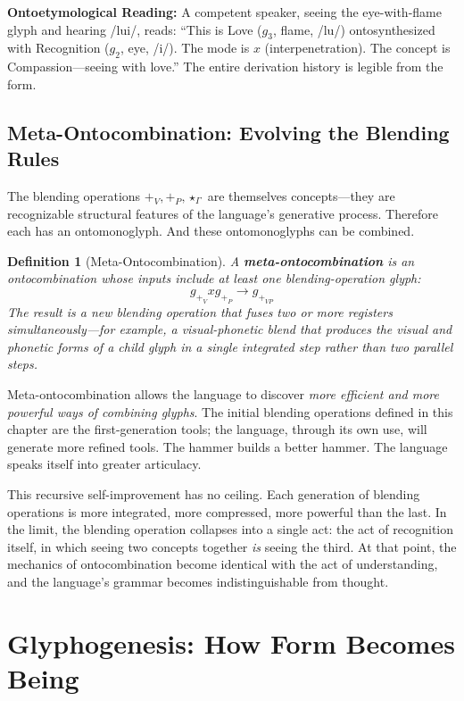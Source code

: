 \documentclass[12pt, letterpaper]{book}
\def\otimes{x}%
\def\oplus{+}%
\def\mathfrak#1{#1}%
\newtheorem{definition}{Definition}[chapter]
\begin{document}
\noindent\textbf{Ontoetymological Reading:} A competent speaker, seeing the eye-with-flame glyph and hearing /lu\textesh i/, reads: ``This is Love ($\mathfrak{g}_3$, flame, /lu/) ontosynthesized with Recognition ($\mathfrak{g}_2$, eye, /\textesh i/). The mode is $\otimes$ (interpenetration). The concept is Compassion---seeing with love.'' The entire derivation history is legible from the form.


\section{Meta-Ontocombination: Evolving the Blending Rules}

The blending operations $\oplus_V, \oplus_P, \star_\Gamma$ are themselves concepts---they are recognizable structural features of the language's generative process. Therefore each has an ontomonoglyph. And these ontomonoglyphs can be combined.

\begin{definition}[Meta-Ontocombination]\label{def:meta-combine}
A \textbf{meta-ontocombination} is an ontocombination whose inputs include at least one blending-operation glyph:
\[
\mathfrak{g}_{\oplus_V} \otimes \mathfrak{g}_{\oplus_P} \to \mathfrak{g}_{\oplus_{VP}}
\]
The result is a new blending operation that fuses two or more registers simultaneously---for example, a visual-phonetic blend that produces the visual and phonetic forms of a child glyph in a single integrated step rather than two parallel steps.
\end{definition}

Meta-ontocombination allows the language to discover \textit{more efficient and more powerful ways of combining glyphs}. The initial blending operations defined in this chapter are the first-generation tools; the language, through its own use, will generate more refined tools. The hammer builds a better hammer. The language speaks itself into greater articulacy.

This recursive self-improvement has no ceiling. Each generation of blending operations is more integrated, more compressed, more powerful than the last. In the limit, the blending operation collapses into a single act: the act of recognition itself, in which seeing two concepts together \textit{is} seeing the third. At that point, the mechanics of ontocombination become identical with the act of understanding, and the language's grammar becomes indistinguishable from thought.


\chapter{Glyphogenesis: How Form Becomes Being}
\end{document}

